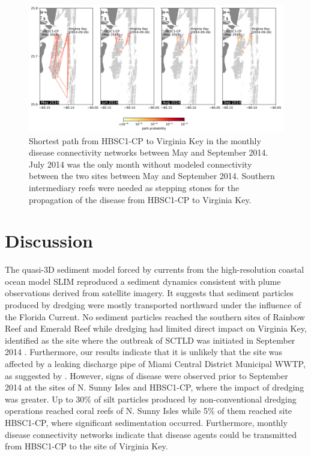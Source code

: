 \begin{figure}
	\centering
	\includegraphics[width=\textwidth]{chapters/onset/figures/fig_paths.png}
	\caption{Shortest path from HBSC1-CP to Virginia Key in the monthly disease connectivity networks between May and September 2014. July 2014 was the only month without modeled connectivity between the two sites between May and September 2014. Southern intermediary reefs were needed as stepping stones for the propagation of the disease from HBSC1-CP to Virginia Key.}
	\label{fig:onset_path}
\end{figure}

\section{Discussion}

The quasi-3D sediment model forced by currents from the high-resolution coastal ocean model SLIM reproduced a sediment dynamics consistent with plume observations derived from satellite imagery. It suggests that sediment particles produced by dredging were mostly transported northward under the influence of the Florida Current. No sediment particles reached the southern sites of Rainbow Reef and Emerald Reef while dredging had limited direct impact on Virginia Key, identified as the site where the outbreak of SCTLD was initiated in September 2014 \citep{precht2016unprecedented}. Furthermore, our results indicate that it is unlikely that the site was affected by a leaking discharge pipe of Miami Central District Municipal WWTP, as suggested by \cite{gintert2019regional}. However, signs of disease were observed prior to September 2014 at the sites of N. Sunny Isles and HBSC1-CP, where the impact of dredging was greater. Up to 30\% of silt particles produced by non-conventional dredging operations reached coral reefs of N. Sunny Isles while 5\% of them reached site HBSC1-CP, where significant sedimentation occurred. Furthermore, monthly disease connectivity networks indicate that disease agents could be transmitted from HBSC1-CP to the site of Virginia Key.   

